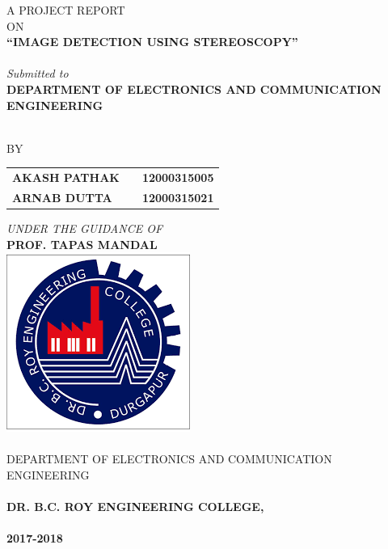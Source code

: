 
\newpage

\begin{center}
\thispagestyle{empty}
\Large{\textsc{A PROJECT REPORT\\ON}}\\[0.3cm]
\Large{\textsc {\textbf{``IMAGE DETECTION USING STEREOSCOPY''}}}\\
\Large{\emph{\\Submitted to}}
\LARGE{\textbf{\\DEPARTMENT OF ELECTRONICS AND COMMUNICATION ENGINEERING\\}}
\vspace{0.3cm}

\Large{\textsc{\\BY}}\\[0.3cm]
\begin{table}[h]
\centering
\Large{
\begin{tabular}{>{\bfseries}lc>{\bfseries}r}
AKASH PATHAK & & 12000315005\\ARNAB DUTTA & & 12000315021\\
\end{tabular}}
\end{table}
\vspace{1cm}
\large{\emph{UNDER THE GUIDANCE OF}}\\
\Large{\textbf{PROF. TAPAS MANDAL}}\\[1cm]
\vspace{1.6cm}
\includegraphics[scale=0.4]{project/images/download.png}\\
\large{\textsc{\\DEPARTMENT OF ELECTRONICS AND COMMUNICATION ENGINEERING}}\\
\Large{\textbf{\\DR. B.C. ROY ENGINEERING COLLEGE,}}\\
\large{\textbf{\\2017-2018}}\\[0.5cm]
\newpage

\end{center}